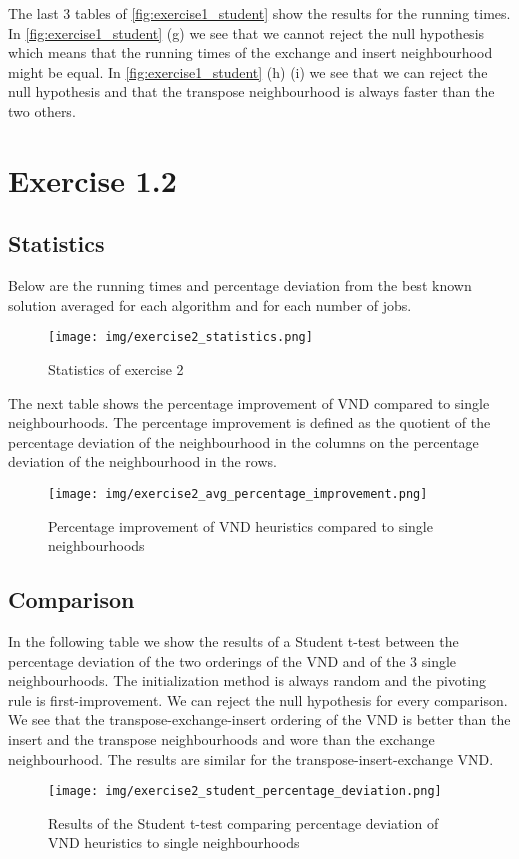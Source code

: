 \documentclass[a4paper,10pt]{article}
\begin{document}
The last 3 tables of \ref{fig:exercise1_student} show the results for the running times. In \ref{fig:exercise1_student} (g) we see that we cannot reject the null hypothesis which means that the running times of the exchange and insert neighbourhood might be equal. In \ref{fig:exercise1_student} (h) (i) we see that we can reject the null hypothesis and that the transpose neighbourhood is always faster than the two others.

\section{Exercise 1.2}

\subsection{Statistics}

Below are the running times and percentage deviation from the best known solution averaged for each algorithm and for each number of jobs.

\begin{figure}[H]
	\centering
	\caption{Statistics of exercise 2}
	\texttt{[image: img/exercise2\_statistics.png]}
\end{figure}


The next table shows the percentage improvement of VND compared to single neighbourhoods. The percentage improvement is defined as the quotient of the percentage deviation of the neighbourhood in the columns on the percentage deviation of the neighbourhood in the rows.
\begin{figure}[H]
	\centering
	\caption{Percentage improvement of VND heuristics compared to single neighbourhoods}
	\texttt{[image: img/exercise2\_avg\_percentage\_improvement.png]}
\end{figure}

\subsection{Comparison}

In the following table we show the results of a Student t-test between the percentage deviation of the two orderings of the VND and of the 3 single neighbourhoods. The initialization method is always random and the pivoting rule is first-improvement. We can reject the null hypothesis for every comparison. We see that the transpose-exchange-insert ordering of the VND is better than the insert and the transpose neighbourhoods and wore than the exchange neighbourhood. The results are similar for the transpose-insert-exchange VND.

\begin{figure}[H]
	\centering
	\caption{Results of the Student t-test comparing percentage deviation of VND heuristics to single neighbourhoods}
	\texttt{[image: img/exercise2\_student\_percentage\_deviation.png]}
\end{figure}
\end{document}
